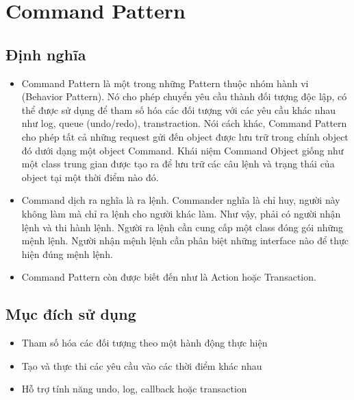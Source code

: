 \chapter{Command Pattern}

\section{Định nghĩa}
\begin{itemize}
\item Command Pattern là một trong những Pattern thuộc nhóm hành vi (Behavior Pattern). Nó cho phép chuyển yêu cầu thành đối tượng độc lập, có thể được sử dụng để tham số hóa các đối tượng với các yêu cầu khác nhau như log, queue (undo/redo), transtraction. Nói cách khác, Command Pattern cho phép tất cả những request gửi đến object được lưu trữ trong chính object đó dưới dạng một object Command. Khái niệm Command Object giống như một class trung gian được tạo ra để lưu trữ các câu lệnh và trạng thái của object tại một thời điểm nào đó.
\item Command dịch ra nghĩa là ra lệnh. Commander nghĩa là chỉ huy, người này không làm mà chỉ ra lệnh cho người khác làm. Như vậy, phải có người nhận lệnh và thi hành lệnh. Người ra lệnh cần cung cấp một class đóng gói những mệnh lệnh. Người nhận mệnh lệnh cần phân biệt những interface nào để thực hiện đúng mệnh lệnh.
\item Command Pattern còn được biết đến như là Action hoặc Transaction.
\end{itemize}

\section{Mục đích sử dụng}
\begin{itemize}
\item Tham số hóa các đối tượng theo một hành động thực hiện
\item Tạo và thực thi các yêu cầu vào các thời điểm khác nhau
\item Hỗ trợ tính năng undo, log, callback hoặc transaction
\end{itemize}

